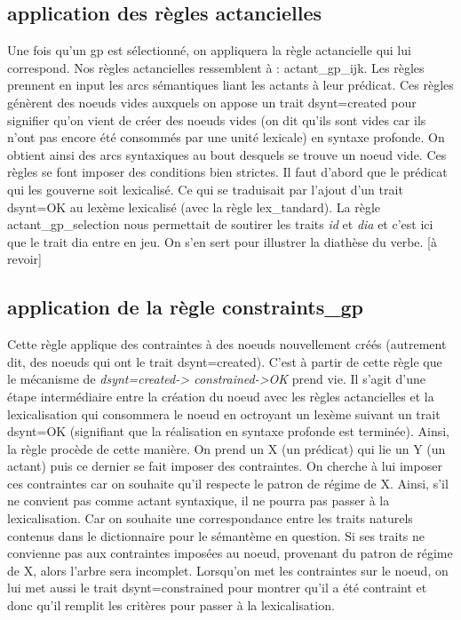 \subsection{application des règles actancielles}
Une fois qu'un gp est sélectionné, on appliquera la règle actancielle qui lui correspond. Nos règles actancielles ressemblent à : actant{\_}gp{\_}ijk. Les règles prennent en input les arcs sémantiques liant les actants à leur prédicat. Ces règles génèrent des noeuds vides auxquels on appose un trait dsynt=created pour signifier qu'on vient de créer des noeuds vides (on dit qu'ils sont vides car ils n'ont pas encore été consommés par une unité lexicale) en syntaxe profonde. On obtient ainsi des arcs syntaxiques au bout desquels se trouve un noeud vide. Ces règles se font imposer des conditions bien strictes. Il faut d'abord que le prédicat qui les gouverne soit lexicalisé. Ce qui se traduisait par l'ajout d'un trait dsynt=OK au lexème lexicalisé (avec la règle lex{\_}tandard). La règle actant{\_}gp{\_}selection nous permettait de soutirer les traits  \emph{ id} et \emph{dia} et c'est ici que le trait dia entre en jeu. On s'en sert pour illustrer la diathèse du verbe. [à revoir]

\subsection{application de la règle constraints{\_}gp}
Cette règle applique des contraintes à des noeuds nouvellement créés (autrement dit, des noeuds qui ont le trait dsynt=created). C'est à partir de cette règle que le mécanisme de \emph{dsynt=created-> constrained->OK} prend vie. Il s'agit d'une étape intermédiaire entre la création du noeud avec les règles actancielles et la lexicalisation qui consommera le noeud en octroyant un lexème suivant un trait dsynt=OK (signifiant que la réalisation en syntaxe profonde est terminée). Ainsi, la règle procède de cette manière. On prend un X (un prédicat) qui lie un Y (un actant) puis ce dernier se fait imposer des contraintes. On cherche à lui imposer ces contraintes car on souhaite qu'il respecte le patron de régime de X. Ainsi, s'il ne convient pas comme actant syntaxique, il ne pourra pas passer à la lexicalisation. Car on souhaite une correspondance entre les traits naturels contenus dans le dictionnaire pour le sémantème en question. Si ses traits ne convienne pas aux contraintes imposées au noeud, provenant du patron de régime de X, alors l'arbre sera incomplet. Lorsqu'on met les contraintes sur le noeud, on lui met aussi le trait dsynt=constrained pour montrer qu'il a été contraint et donc qu'il remplit les critères pour passer à la lexicalisation.

